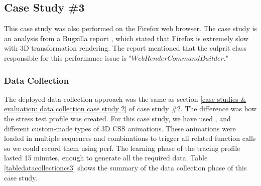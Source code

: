 \documentclass[pdflatex,sn-nature]{sn-jnl}%
\theoremstyle{thmstyleone}%
\theoremstyle{thmstyletwo}%
\theoremstyle{thmstylethree}%
\begin{document}
\begin{table}[tbp]

\centering
{}
\caption{Evaluation | Issue: Driver Communication Between Hardware \& Application | 100 Samples | Case Study: 2}
\label{tableevaluationcs21}
\end{table}




\subsection{Case Study \#3}\label{case studies & evaluation: case study 3}

This case study was also performed on the Firefox web browser. The case study is an analysis from a Bugzilla report \cite{muizelaar-2020}, which stated that Firefox is extremely slow with 3D transformation rendering. The report mentioned that the culprit class responsible for this performance issue is "$WebRenderCommandBuilder$."

\subsubsection{Data Collection}
The deployed data collection approach was the same as section \ref{case studies & evaluation: data collection case study 2} of case study \#2. The difference was how the stress test profile was created. For this case study, we have used \cite{loopingsquares}, \cite{3dtransformation} and different custom-made types of 3D CSS animations. These animations were loaded in multiple sequences and combinations to trigger all related function calls so we could record them using perf. The learning phase of the tracing profile lasted 15 minutes, enough to generate all the required data. Table \ref{tabledatacollectioncs3} shows the summary of the data collection phase of this case study.
\end{document}
